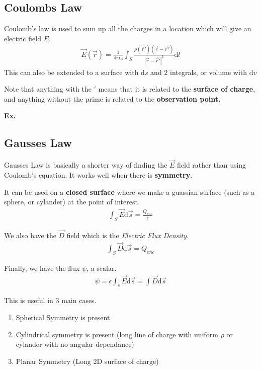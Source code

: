 \documentclass[12pt,letterpaper]{article} \usepackage{amsmath} \usepackage{graphicx} \usepackage[margin=1in]{geometry} \usepackage{longtable}  \usepackage{amssymb}
\begin{document}
	\subsection{Coulombs Law}
	Coulomb's law is used to sum up all the charges in a location which will give an electric field $E$.
	\begin{align*}
		\vec E (\vec r) = \frac{1}{4\pi \epsilon_0} \int_S \frac{\rho(\vec r\prime)(\vec r - \vec r\prime)}{|\vec r - \vec r\prime | ^3}\mathrm d l
	\end{align*}
	This can also be extended to a surface with $\mathrm ds$ and 2 integrals, or volume with $\mathrm dv$
	
	Note that anything with the $\prime$ means that it is related to the \textbf{surface of charge}, and anything without the prime is related to the \textbf{observation point.}
	
	\begin{mdframed}
		\textbf{Ex. }
	\end{mdframed}
	
	\subsection{Gausses Law}
	Gausses Law is basically a shorter way of finding the $\vec E$ field rather than using Coulomb's equation. It works well when there is \textbf{symmetry}.
	
	It can be used on a \textbf{closed surface} where we make a guassian surface (such as a sphere, or cylander) at the point of interest. 
	\begin{align*}
		\int_S \vec E \mathrm d \vec s = \frac{Q_{enc}}{\epsilon}
	\end{align*}

	We also have the $\vec D$ field which is the \textit{Electric Flux Density}.
	\begin{align*}
		\int_S \vec D \mathrm d \vec s = Q_{enc}
	\end{align*}
	
	Finally, we have the flux $\psi$, a scalar. 
	\begin{align*}
		\psi = \epsilon \int_s \vec E \mathrm d \vec s = \int \vec D \mathrm d \vec s
	\end{align*}

	This is useful in 3 main cases. 
	\begin{enumerate}[]
		\item Spherical Symmetry is present
		\item Cylindrical symmetry is present (long line of charge with uniform $\rho$ or cylander with no angular dependance)
		\item Planar Symmetry (Long 2D surface of charge)
	\end{enumerate}
\end{document}
